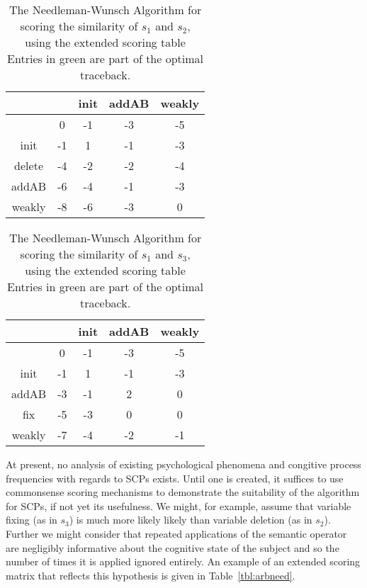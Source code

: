 \begin{table}
\begin{center}

\begin{tabular}{ c | c c c c}
& & init & addAB & weakly  \\ \hline
& 0 & -1 & -3 & -5  \\

init & -1 & 1 & -1 & -3 \\

delete & -4 &-2  & -2 & -4 \\

addAB & -6 & -4  & -1 & -3 \\

weakly & -8 & -6 & -3 & 0   \\
 
\end{tabular}
\caption{The Needleman-Wunsch Algorithm for scoring the similarity of $s_1$ and $s_2$, using the extended scoring table Entries in green are part of the optimal traceback.}
\label{tbl:exneeds1s2}

\end{center}
\end{table}


\begin{table}
\begin{center}

\begin{tabular}{ c | c c c c}
& & init & addAB & weakly  \\ \hline
& 0 & -1 & -3 & -5  \\

init & -1 & 1  & -1 & -3 \\

addAB & -3 & -1  & 2 & 0 \\

fix & -5 & -3 & 0 & 0 \\

weakly & -7 & -4 & -2 & -1   \\
 
\end{tabular}
\caption{The Needleman-Wunsch Algorithm for scoring the similarity of $s_1$ and $s_3$, using the extended scoring table Entries in green are part of the optimal traceback.}
\label{tbl:exneeds1s3}

\end{center}
\end{table}


At present, no analysis of existing psychological phenomena and congitive process frequencies with regards to SCPs exists. Until one is created, it suffices to use commonsense scoring mechanisms to demonstrate the suitability of the algorithm for SCPs, if not yet its usefulness. We might, for example, assume that variable fixing (as in $s_3$) is much more likely likely than variable deletion (as in $s_2$). Further we might consider that repeated applications of the semantic operator are negligibly informative about the cognitive state of the subject and so the number of times it is applied ignored entirely. An example of an extended scoring matrix that reflects this hypothesis is given in Table~\ref{tbl:arbneed}. 

